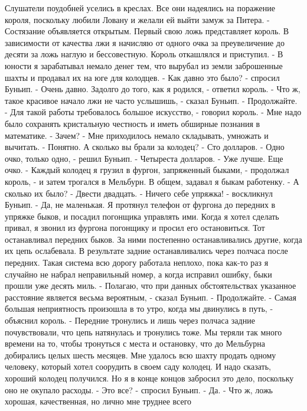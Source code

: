     Слушатели поудобней уселись в креслах. Все они надеялись на 
поражение короля, поскольку любили Ловану и желали ей выйти замуж за 
Питера.
    - Состязание объявляется открытым. Первый свою ложь представляет 
король. В зависимости от качества лжи я начисляю от одного очка за 
преувеличение до десяти за ложь наглую и бессовестную.
    Король откашлялся и приступил.
    - В юности я зарабатывал немало денег тем, что вырубал из земли 
заброшенные шахты и продавал их на юге для колодцев.
    - Как давно это было? - спросил Буньип.
    - Очень давно. Задолго до того, как я родился, - ответил король.
    - Что ж, такое красивое начало лжи не часто услышишь, - сказал 
Буньип. - Продолжайте.
    - Для такой работы требовалось большое искусство, - говорил 
король. - Мне надо было сохранять кристальную честность и иметь 
обширные познания в математике.
    - Зачем?
    - Мне приходилось немало складывать, умножать и вычитать.
    - Понятно. А сколько вы брали за колодец?
    - Сто долларов.
    - Одно очко, только одно, - решил Буньип.
    - Четыреста долларов.
    - Уже лучше. Еще очко.
    - Каждый колодец я грузил в фургон, запряженный быками, - 
продолжал король, - и затем трогался в Мельбурн. В общем, задавал я 
быкам работенку.
    - А сколько их было?
    - Двести двадцать.
    - Ничего себе упряжка! - воскликнул Буньип.
    - Да, не маленькая. Я протянул телефон от фургона до передних в 
упряжке быков, и посадил погонщика управлять ими. Когда я хотел 
сделать привал, я звонил из фургона погонщику и просил его 
остановиться. Тот останавливал передних быков. За ними постепенно 
останавливались другие, когда их цепь ослабевала. В результате задние 
останавливались через полчаса после передних. Такая система всю дорогу 
работала неплохо, пока как-то раз я случайно не набрал неправильный 
номер, а когда исправил ошибку, быки прошли уже десять миль.
    - Полагаю, что при данных обстоятельствах указанное расстояние 
является весьма вероятным, - сказал Буньип. - Продолжайте.
    - Самая большая неприятность произошла в то утро, когда мы 
двинулись в путь, - объяснил король. - Передние тронулись и лишь через 
полчаса задние почувствовали, что цепь натянулась и тронулись тоже. Мы 
теряли так много времени на то, чтобы тронуться с места и остановку, 
что до Мельбурна добирались целых шесть месяцев. Мне удалось всю шахту 
продать одному человеку, который хотел соорудить в своем саду колодец. 
И надо сказать, хороший колодец получился. Но я в конце концов 
забросил это дело, поскольку оно не окупало расходы.
    - Это все? - спросил Буньип.
    - Да.
    - Что ж, ложь хорошая, качественная, но лично мне труднее всего 
